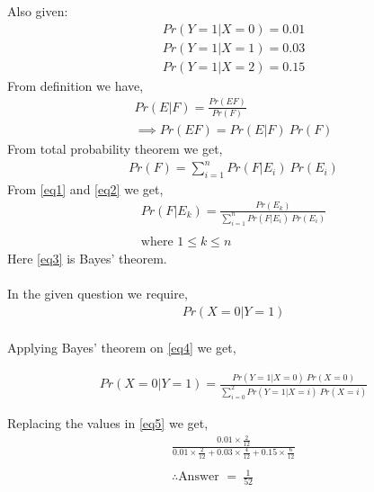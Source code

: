 \documentclass[journal,12pt,twocolumn]{IEEEtran}
\begin{document}
Also given: \\
\begin{align}
    Pr(Y=1|X=0) = 0.01 \\
    Pr(Y=1|X=1) = 0.03 \\
    Pr(Y=1|X=2) = 0.15
\end{align}
From definition we have,
\begin{align}
    Pr(E|F) = \frac{Pr(EF)}{Pr(F)}\\
    \implies Pr(EF) = Pr(E|F)\: Pr(F) \label{eq1}
\end{align}
From total probability theorem we get,
\begin{align}
    Pr(F) = \sum_{i=1}^n Pr(F|E_{i})\: Pr(E_{i}) \label{eq2}
\end{align}
From \eqref{eq1} and \eqref{eq2} we get,
\begin{align}
    Pr(F|E_{k}) = \frac{Pr(E_{k})}{\sum_{i=1}^n Pr(F|E_{i})\: Pr(E_{i})} \label{eq3}\\
    \nonumber\\
    \text{where }  1\leq k\leq n \nonumber
\end{align}
Here \eqref{eq3} is Bayes' theorem.\\ \\
In the given question we require,
\begin{align}
    Pr(X=0|Y=1) \label{eq4}
\end{align}
\\Applying Bayes' theorem on \eqref{eq4} we get,

\begin{align}
    Pr(X=0|Y=1) = \frac{Pr(Y=1|X=0)\: Pr(X=0)}{\sum_{i=0}^2 Pr(Y=1|X=i)\: Pr(X=i)}\label{eq5}
\end{align}

Replacing the values in \eqref{eq5} we get,
\begin{align}
    \frac{0.01\times\frac{2}{12}}{0.01\times \frac{2}{12}+0.03\times \frac{4}{12}+0.15\times \frac{6}{12}}\\
    \nonumber\\
    \therefore \text{Answer }= \:\frac{1}{52}
\end{align}
\end{document}
